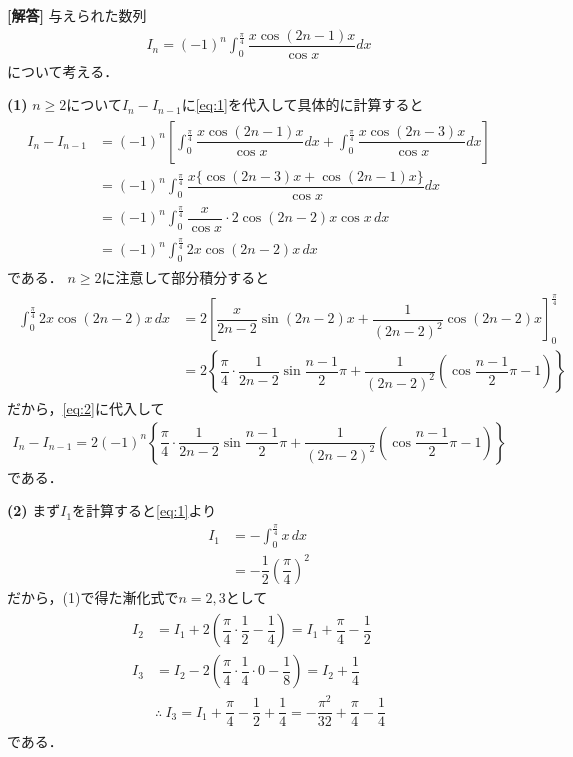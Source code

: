 \documentclass[../../main.tex]{subfiles}
\begin{document}
\begin{oframed}
  
\end{oframed}

{\bf [解答]}
与えられた数列
\begin{align}
  I_n=(-1)^n\int_0^{\frac{\pi}{4}}\dfrac{x\cos(2n-1)x}{\cos x}dx \label{eq:1}
\end{align}
について考える．

\textbf{(1)}
$n \ge 2$について$I_n-I_{n-1}$に\cref{eq:1}を代入して具体的に計算すると
\begin{align}
  \begin{split}
    I_n-I_{n-1}
    &=(-1)^n\left[\int_0^{\frac{\pi}{4}}\dfrac{x\cos(2n-1)x}{\cos x}dx+\int_0^{\frac{\pi}{4}}\dfrac{x\cos(2n-3)x}{\cos x}dx\right] \\
    &=(-1)^n\int_0^{\frac{\pi}{4}}\dfrac{x\{\cos(2n-3)x+\cos(2n-1)x\}}{\cos x}dx \\
    &=(-1)^n\int_0^{\frac{\pi}{4}}\dfrac{x}{\cos x}\cdot2\cos(2n-2)x\cos x\,dx \\
    &=(-1)^n\int_0^{\frac{\pi}{4}}2x\cos(2n-2)x\,dx
  \end{split} \label{eq:2}
\end{align}
である．
$n\ge2$に注意して部分積分すると
\begin{align}
  \begin{split}
    \int_0^{\frac{\pi}{4}}2x\cos(2n-2)x\,dx
    &=2\left[\dfrac{x}{2n-2}\sin(2n-2)x+\dfrac{1}{(2n-2)^2}\cos(2n-2)x\right]_0^{\frac{\pi}{4}} \\
    &=2\left\{\dfrac{\pi}{4}\cdot\dfrac{1}{2n-2}\sin\dfrac{n-1}{2}\pi+\dfrac{1}{(2n-2)^2}\left(\cos\dfrac{n-1}{2}\pi-1\right)\right\}
  \end{split}
\end{align}
だから，\cref{eq:2}に代入して
\begin{align}
  I_n-I_{n-1}=2(-1)^n\left\{\dfrac{\pi}{4}\cdot\dfrac{1}{2n-2}\sin\dfrac{n-1}{2}\pi+\dfrac{1}{(2n-2)^2}\left(\cos\dfrac{n-1}{2}\pi-1\right)\right\}
\end{align}
である．

\textbf{(2)}
まず$I_1$を計算すると\cref{eq:1}より
\begin{align}
  I_1
  &=-\int_0^{\frac{\pi}{4}}x\,dx \\
  &=-\dfrac{1}{2}\left(\dfrac{\pi}{4}\right)^2
\end{align}
だから，(1)で得た漸化式で$n=2,3$として
\begin{align}
  \begin{split}
    I_2&=I_1+2\left(\dfrac{\pi}{4}\cdot\dfrac{1}{2}-\dfrac{1}{4}\right)=I_1+\dfrac{\pi}{4}-\dfrac{1}{2} \\
    I_3&=I_2-2\left(\dfrac{\pi}{4}\cdot\dfrac{1}{4}\cdot0-\dfrac{1}{8}\right)=I_2+\dfrac{1}{4} \\
    &\therefore\ I_3=I_1+\dfrac{\pi}{4}-\dfrac{1}{2}+\dfrac{1}{4}=-\dfrac{\pi^2}{32}+\dfrac{\pi}{4}-\dfrac{1}{4}
  \end{split}
\end{align}
である．
\end{document}
